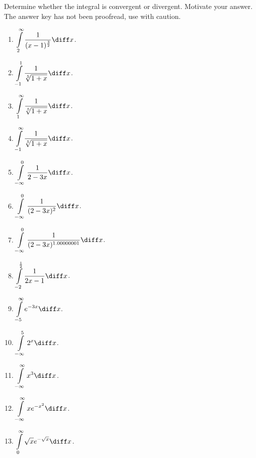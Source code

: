 Determine whether the integral is convergent or divergent. Motivate your answer. The answer key has not been proofread, use with caution.

\begin{multicols}{2}
\begin{enumerate}[ref={\fcProblemRef}]
\item $\displaystyle \int\limits_{2}^{\infty}\frac{1}{(x-1)^{\frac32}} \diff x$.

\item $\displaystyle \int\limits_{-1}^{1}\frac{1}{\sqrt[5]{1+x}} \diff x$.

\item $\displaystyle \int\limits_{1}^{\infty }\frac{1}{\sqrt[5]{1+x}} \diff x$.

\item $\displaystyle \int\limits_{-1}^{\infty }\frac{1}{\sqrt[5]{1+x}} \diff x$.

\item $\displaystyle \int\limits_{-\infty }^{0}\frac{1}{2-3x} \diff x$.

\item $\displaystyle \int\limits_{-\infty }^{0}\frac{1}{(2-3x)^{2}} \diff x$.

\item $\displaystyle \int\limits_{-\infty }^{0}\frac{1}{(2-3x)^{1.00000001}} \diff x$.

\item $\displaystyle \int\limits_{-2}^{ \frac{1}{ 2}} \frac{1}{2x-1} \diff x$.

\item $\displaystyle \int\limits_{-5}^{\infty} e^{-3x} \diff x$.

\item $\displaystyle \int\limits_{-\infty }^{5}  2^x \diff x$.

\item $\displaystyle \int\limits_{-\infty }^{\infty}x^3 \diff x$.

\item  $\displaystyle \int\limits_{-\infty}^{\infty} x e^{-x^2} \diff x$.

\item \label{problemConvergencesqrt(x)e^-sqrt(x)zerotoinfty} $\displaystyle \int\limits_{0}^{\infty} \sqrt{x} e^{-\sqrt{x}} \diff x$.


\end{enumerate}
\end{multicols}
